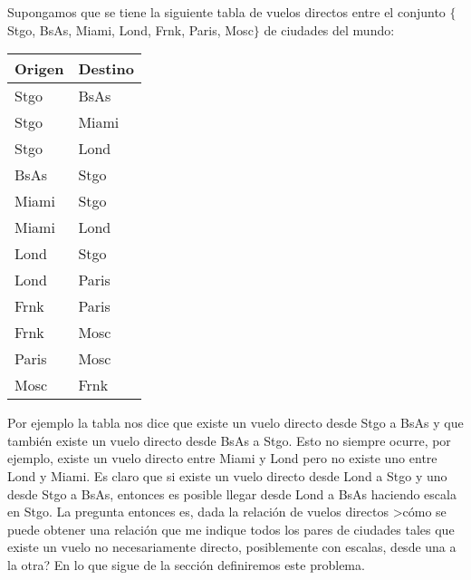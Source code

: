 \begin{ejemplo}
Supongamos que se tiene la siguiente tabla de vuelos directos entre el conjunto $\{$Stgo, BsAs, Miami, Lond, Frnk, Paris, Mosc$\}$ de ciudades del mundo:
\begin{center}
\begin{tabular}{l|l} 
Origen & Destino \\ \hline
Stgo & BsAs \\
Stgo & Miami \\
Stgo & Lond \\
BsAs & Stgo \\
Miami & Stgo \\
Miami & Lond \\
Lond & Stgo \\
Lond & Paris \\
Frnk & Paris \\
Frnk & Mosc \\
Paris & Mosc \\
Mosc & Frnk 
\end{tabular}
\end{center}
Por ejemplo la tabla nos dice que existe un vuelo directo desde Stgo a BsAs y que también existe un vuelo directo desde BsAs a Stgo.
Esto no siempre ocurre, por ejemplo, existe un vuelo directo entre Miami y Lond pero no existe uno entre Lond y Miami.
Es claro que si existe un vuelo directo desde Lond a Stgo y uno desde Stgo a BsAs, entonces es posible llegar desde Lond a BsAs haciendo escala en Stgo.
La pregunta entonces es, dada la relación de vuelos directos >cómo se puede obtener una relación que me indique todos los pares de ciudades tales que existe un vuelo no necesariamente directo, posiblemente con escalas, desde una a la otra?
En lo que sigue de la sección definiremos este problema.
\end{ejemplo}
